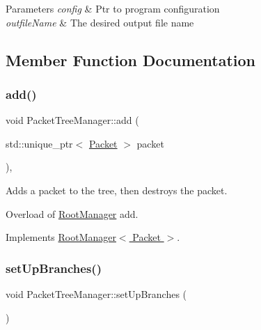 \begin{DoxyParams}{Parameters}
{\em config} & Ptr to program configuration \\
\hline
{\em outfile\+Name} & The desired output file name \\
\hline
\end{DoxyParams}


\subsection{Member Function Documentation}
\mbox{\label{class_packet_tree_manager_a855e71512fe6365c11f312584afff70a}} 
\subsubsection{\texorpdfstring{add()}{add()}}
{\footnotesize\ttfamily void Packet\+Tree\+Manager\+::add (\begin{DoxyParamCaption}\item[{std\+::unique\+\_\+ptr$<$ \hyperlink{class_packet}{Packet} $>$}]{packet }\end{DoxyParamCaption})\hspace{0.3cm}{\ttfamily [final]}, {\ttfamily [virtual]}}



Adds a packet to the tree, then destroys the packet. 

Overload of \hyperlink{class_root_manager}{Root\+Manager} add. 

Implements \hyperlink{class_root_manager_a2f05eb45d5eaee1f9f12e299395652fb}{Root\+Manager$<$ Packet $>$}.

\mbox{\label{class_packet_tree_manager_a3e2aa24c5acd8a87b15cfff2d011f30b}} 
\subsubsection{\texorpdfstring{set\+Up\+Branches()}{setUpBranches()}}
{\footnotesize\ttfamily void Packet\+Tree\+Manager\+::set\+Up\+Branches (\begin{DoxyParamCaption}{ }\end{DoxyParamCaption})\hspace{0.3cm}{\ttfamily [private]}}



